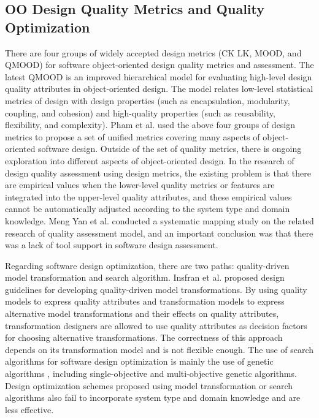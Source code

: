 \documentclass[pdflatex,sn-mathphys-num]{sn-jnl}%
\theoremstyle{thmstyleone}%
\theoremstyle{thmstyletwo}%
\theoremstyle{thmstylethree}%
\begin{document}
\subsection{OO Design Quality Metrics and Quality Optimization}
There are four groups of widely accepted design metrics (CK\cite{CK} LK\cite{LK}, MOOD\cite{MOOD}, and QMOOD\cite{QMOOD}) for software object-oriented design quality metrics and assessment. The latest QMOOD is an improved hierarchical model for evaluating high-level design quality attributes in object-oriented design. The model relates low-level statistical metrics of design with design properties (such as encapsulation, modularity, coupling, and cohesion) and high-quality properties (such as reusability, flexibility, and complexity). Pham\cite{Pham} et al. used the above four groups of design metrics to propose a set of unified metrics covering many aspects of object-oriented software design. Outside of the set of quality metrics, there is ongoing exploration into different aspects of object-oriented design. In the research of design quality assessment using design metrics, the existing problem is that there are empirical values when the lower-level quality metrics or features are integrated into the upper-level quality attributes, and these empirical values cannot be automatically adjusted according to the system type and domain knowledge. Meng Yan\cite{YM17} et al. conducted a systematic mapping study on the related research of quality assessment model, and an important conclusion was that there was a lack of tool support in software design assessment.

Regarding software design optimization, there are two paths: quality-driven model transformation and search algorithm. Insfran \cite{Insfran} et al. proposed design guidelines for developing quality-driven model transformations. By using quality models to express quality attributes and transformation models to express alternative model transformations and their effects on quality attributes, transformation designers are allowed to use quality attributes as decision factors for choosing alternative transformations. The correctness of this approach depends on its transformation model and is not flexible enough. The use of search algorithms for software design optimization is mainly the use of genetic algorithms \cite{GA1, GA2, GA3}, including single-objective and multi-objective genetic algorithms. Design optimization schemes proposed using model transformation or search algorithms also fail to incorporate system type and domain knowledge and are less effective.
\end{document}
